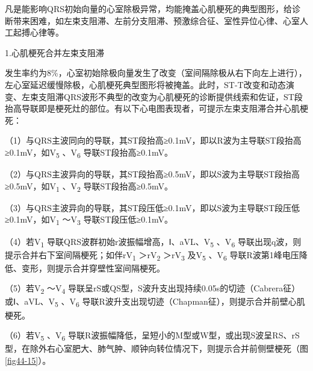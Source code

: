 凡是能影响QRS初始向量的心室除极异常，均能掩盖心肌梗死的典型图形，给诊断带来困难，如左束支阻滞、左前分支阻滞、预激综合征、室性异位心律、心室人工起搏心律等。

1.心肌梗死合并左束支阻滞

发生率约为8\%，心室初始除极向量发生了改变（室间隔除极从右下向左上进行），左心室延迟缓慢除极，心肌梗死典型图形将被掩盖。此时，ST-T改变和动态演变、左束支阻滞QRS波形不典型的改变为心肌梗死的诊断提供线索和佐证，ST段抬高导联即是梗死灶的部位。有以下心电图表现者，可提示左束支阻滞合并心肌梗死：

（1）与QRS主波同向的导联，其ST段抬高≥0.1mV，即以R波为主导联ST段抬高≥0.1mV，如V\textsubscript{5}
、V\textsubscript{6} 导联ST段抬高≥0.1mV。

（2）与QRS主波异向的导联，其ST段抬高≥0.5mV，即以S波为主导联ST段抬高≥0.5mV，如V\textsubscript{1}
、V\textsubscript{2} 导联ST段抬高≥0.5mV。

（3）与QRS主波异向的导联，其ST段压低≥0.1mV，即以S波为主导联ST段压低≥0.1mV，如V\textsubscript{1}
～V\textsubscript{3} 导联ST段压低≥0.1mV。

（4）若V\textsubscript{1}
导联QRS波群初始r波振幅增高，Ⅰ、aVL、V\textsubscript{5}
、V\textsubscript{6}
导联出现q波，则提示合并右下室间隔梗死；如伴rV\textsubscript{1}
＞rV\textsubscript{2} ＞rV\textsubscript{3} 及V\textsubscript{5}
、V\textsubscript{6}
导联R波第1峰电压降低、变形，则提示合并穿壁性室间隔梗死。

（5）若V\textsubscript{2} ～V\textsubscript{4}
导联呈rS或QS型，S波升支出现持续0.05s的切迹（Cabrera征）或Ⅰ、aVL、V\textsubscript{5}
、V\textsubscript{6}
导联R波升支出现切迹（Chapman征），则提示合并前壁心肌梗死。

（6）若V\textsubscript{5} 、V\textsubscript{6}
导联R波振幅降低，呈短小的M型或W型，或出现S波呈RS、rS型，在除外右心室肥大、肺气肿、顺钟向转位情况下，则提示合并前侧壁梗死（图\ref{fig44-15}）。

